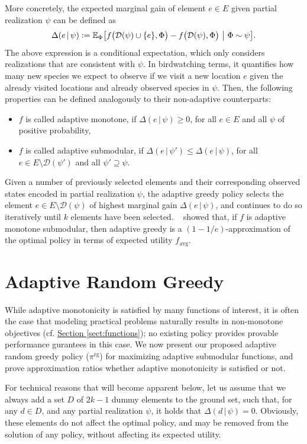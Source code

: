 \documentclass{article}
\newcommand{\sectref}[1]{\hyperref[#1]{Section \ref*{#1}}}
\newcommand{\defeq}{\vcentcolon=}
\newcommand{\mmid}{\,\vert\,}
\newcommand{\D}[2]{\Delta(#1\mmid#2)}
\newcommand{\pig}{\pi^{\textrm{rg}}}
\newcommand{\favg}{f_{\mathrm{avg}}}
\newcommand{\dom}{\mathcal{D}}
\newcommand{\citet}[1]{\citeauthor{#1}~\shortcite{#1}}
\begin{document}
More concretely, the expected marginal gain of element $e \in E$ given partial realization $\psi$ can be defined as
\begin{align*}
  \D{e}{\psi} \defeq \E[\Phi]{f\big(\mathcal{D}(\psi) \cup \{e\}, \Phi\big) - f\big(\dom(\psi), \Phi\big)}[\Phi \sim \psi].
\end{align*}
The above expression is a conditional expectation, which only considers realizations that are consistent with $\psi$.
In birdwatching terms, it quantifies how many new species we expect to observe if we visit a new location $e$ given the already visited locations and already observed species in $\psi$.
Then, the following properties can be defined analogously to their non-adaptive counterparts:
\begin{itemize}
\item $f$ is called adaptive monotone, if $\D{e}{\psi} \geq 0$, for all $e \in E$ and all $\psi$ of positive probability,
\item $f$ is called adaptive submodular, if $\D{e}{\psi'} \leq \D{e}{\psi}$, for all $e \in E \setminus \dom(\psi')$ and all $\psi' \supseteq \psi$.
\end{itemize}

Given a number of previously selected elements and their corresponding observed states encoded in partial realization $\psi$, the adaptive greedy policy selects the element $e \in E \setminus \dom(\psi)$ of highest marginal gain $\D{e}{\psi}$, and continues to do so iteratively until $k$ elements have been selected.
\citet{golovin11} showed that, if $f$ is adaptive monotone submodular, then adaptive greedy is a $(1-1/e)$-approximation of the optimal policy in terms of expected utility $\favg$.

\section{Adaptive Random Greedy}
While adaptive monotonicity is satisfied by many functions of interest, it is often the case that modeling practical problems naturally results in non-monotone objectives (cf. \sectref{sect:functions}); no existing policy provides provable performance gurantees in this case.
We now present our proposed adaptive random greedy policy ($\pig$) for maximizing adaptive submodular functions, and prove approximation ratios whether adaptive monotonicity is satisfied or not.

For technical reasons that will become apparent below, let us assume that we always add a set $D$ of $2k - 1$ dummy elements to the ground set, such that, for any $d \in D$, and any partial realization $\psi$, it holds that $\D{d}{\psi} = 0$.
Obviously, these elements do not affect the optimal policy, and may be removed from the solution of any policy, without affecting its expected utility.
\end{document}
